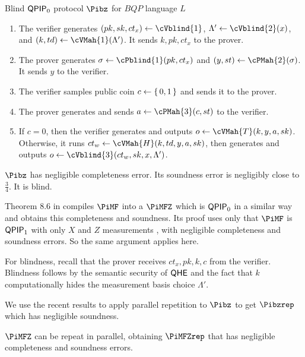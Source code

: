 \begin{protocol}{Blind $\operatorname{\mathsf{QPIP}}_0$ protocol $\Pibz$ for $BQP$ language $L$}
	\label{proto:QPIP0BQP}
	\begin{enumerate}
		\item The verifier generates $(pk, sk, ct_x)\leftarrow\cVblind{1}$,
			$\Lambda'\leftarrow\cVblind{2}(x)$,
			and $(k, td)\leftarrow\cVMah{1}(\Lambda')$.
			It sends $k, pk, ct_x$ to the prover.
		\item The prover generates $\sigma\leftarrow\cPblind{1}(pk, ct_x)$ and
			$(y, st)\leftarrow\cPMah{2}(\sigma)$.
			It sends $y$ to the verifier.
		\item The verifier samples public coin $c\leftarrow\set{0, 1}$ and sends it to the prover.
		\item The prover generates and sends $a\leftarrow\cPMah{3}(c, st)$ to the verifier.
		\item If $c=0$, then the verifier generates and outputs $o\leftarrow\cVMah{T}(k, y, a, sk)$.
			Otherwise, it runs $ct_w\leftarrow\cVMah{H}(k, td, y, a, sk)$,
			then generates and outputs $o\leftarrow\cVblind{3}(ct_w, sk, x, \Lambda')$.
	\end{enumerate}
\end{protocol}

\begin{thm}
	$\Pibz$ has negligible completeness error. Its soundness error is negligibly close to $\frac{3}{4}$. It is blind.
\end{thm}
\begin{prf}
	Theorem $8.6$ in \cite{FOCS:Mahadev18a} compiles $\PiMF$ into a $\PiMFZ$ which is $\operatorname{\mathsf{QPIP}}_0$ in a similar way and obtains this completeness and soundness.
	Its proof uses only that $\PiMF$ is $\operatorname{\mathsf{QPIP}}_1$ with only $X$ and $Z$ measurements , with negligible completeness and soundness errors.
	So the same argument applies here. 

	For blindness, recall that the prover receives $ct_x, pk, k, c$ from the verifier.
	Blindness follows by the semantic security of $\mathsf{QHE}$ and the fact that $k$ computationally hides the measurement basis choice $\Lambda'$.
\end{prf}

We use the recent results \cite{parallelrep, alagic2019twomessage} to apply parallel repetition to $\Pibz$ to get $\Pibzrep$ which has negligible soundness.

\begin{thm}
	\label{thm:MFZrep}
	$\PiMFZ$ can be repeat in parallel, obtaining $\PiMFZrep$ that has negligible completeness and soundness errors.
\end{thm}

